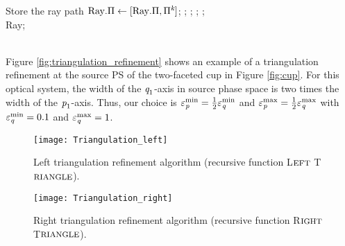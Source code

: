 \begin{algorithm}[h]
\begin{algorithmic}[1]
\State Store the ray path $\mbox{Ray}.\Pi\gets [\mbox{Ray}.\Pi, \Pi^{\textit{k}}]$;
\EndIf
\EndFor
\State{};
\State{};
\State{};
\State{};
\EndIf \\
\Return Ray;
\EndProcedure
\end{algorithmic}
\end{algorithm}
\\ \indent Figure \ref{fig:triangulation_refinement} shows an example of a triangulation refinement at the source PS of the two-faceted cup in Figure \ref{fig:cup}. 
For this optical system, the width of the $\textit{q}_1$-axis in source phase space is two times the width of the $\textit{p}_1$-axis.
Thus, our choice is $\varepsilon_{\textit{p}}^{\textrm{min}}=\frac{1}{2}\varepsilon_{\textit{q}}^{\textrm{min}}$ and $\varepsilon_{\textit{p}}^{\textrm{max}} = \frac{1}{2}\varepsilon_{\textit{q}}^{\textrm{max}}$
with $\varepsilon_{\textit{q}}^{\textrm{min}}=0.1$ and $\varepsilon_{\textit{q}}^{\textrm{max}}=1$.
 \begin{figure}[h]
 \begin{minipage}[t]{0.48\textwidth}
\centering
    \texttt{[image: Triangulation\_left]}
    \caption{Left triangulation refinement algorithm (recursive function L$\footnotesize{\textrm{EFT}}$ T$\footnotesize{\textrm{RIANGLE}}$).}
    \label{fig:triangulation_left}
\end{minipage}
\hfill
\begin{minipage}[t]{0.48\textwidth}
\centering
    \texttt{[image: Triangulation\_right]}
    \caption{Right triangulation refinement algorithm (recursive function R$\footnotesize{\textrm{IGHT}}$ T$\footnotesize{\textrm{RIANGLE}}$).}
    \label{fig:triangulation_right}
\end{minipage}
\end{figure}
